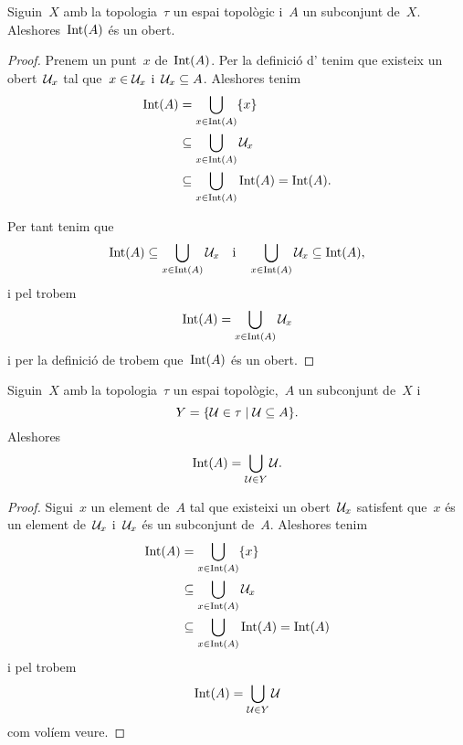 \documentclass[../../main.tex]{subfiles}
\begin{document}
    \begin{proposition}
        \label{prop:l'interior d'un conjunt és un obert}
        Siguin~\(X\) amb la topologia~\(\tau\) un espai topològic i~\(A\) un subconjunt de~\(X\).
        Aleshores~\(\operatorname{Int}(A)\) és un obert.
        \begin{proof}
            Prenem un punt~\(x\) de~\(\operatorname{Int}(A)\).
            Per la definició d' tenim que existeix un obert~\(\mathcal{U}_{x}\) tal que~\(x\in\mathcal{U}_{x}\) i~\(\mathcal{U}_{x}\subseteq A\).
            Aleshores tenim
            \begin{align*}
                \operatorname{Int}(A)&=\bigcup_{x\in\operatorname{Int}(A)}\{x\} \\
                &\subseteq\bigcup_{x\in\operatorname{Int}(A)}\mathcal{U}_{x} \\
                &\subseteq\bigcup_{x\in\operatorname{Int}(A)}\operatorname{Int}(A)=\operatorname{Int}(A).
            \end{align*}

            Per tant tenim que
            \[
                \operatorname{Int}(A)\subseteq\bigcup_{x\in\operatorname{Int}(A)}\mathcal{U}_{x}\quad\text{i}\quad\bigcup_{x\in\operatorname{Int}(A)}\mathcal{U}_{x}\subseteq\operatorname{Int}(A),
            \]
            i pel  trobem
            \[
                \operatorname{Int}(A)=\bigcup_{x\in\operatorname{Int}(A)}\mathcal{U}_{x}
            \]
            i per la definició de  trobem que~\(\operatorname{Int}(A)\) és un obert.
        \end{proof}
    \end{proposition}
    \begin{proposition}
        \label{prop:l'interior d'un conjunt és la unió de tots els oberts continguts en el conjunt}
        Siguin~\(X\) amb la topologia~\(\tau\) un espai topològic,~\(A\) un subconjunt de~\(X\) i
        \[
            Y=\{\mathcal{U}\in\tau\mid\mathcal{U}\subseteq A\}.
        \]
        Aleshores
        \[
            \operatorname{Int}(A)=\bigcup_{\mathcal{U}\in Y}\mathcal{U}.
        \]
        \begin{proof}
            Sigui~\(x\) un element de~\(A\) tal que existeixi un obert~\(\mathcal{U}_{x}\) satisfent que~\(x\) és un element de~\(\mathcal{U}_{x}\) i~\(\mathcal{U}_{x}\) és un subconjunt de~\(A\).
            Aleshores tenim
            \begin{align*}
                \operatorname{Int}(A)&=\bigcup_{x\in\operatorname{Int}(A)}\{x\} \\
                &\subseteq\bigcup_{x\in\operatorname{Int}(A)}\mathcal{U}_{x} \\
                &\subseteq\bigcup_{x\in\operatorname{Int}(A)}\operatorname{Int}(A)=\operatorname{Int}(A)
            \end{align*}
            i pel  trobem
            \[
                \operatorname{Int}(A)=\bigcup_{\mathcal{U}\in Y}\mathcal{U}
            \]
            com volíem veure.
        \end{proof}
    \end{proposition}
\end{document}
